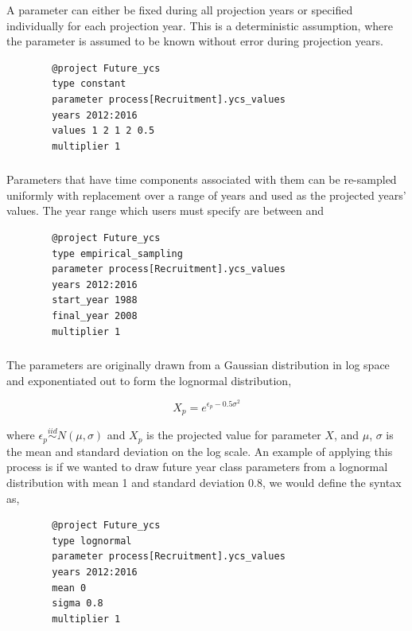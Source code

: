 A parameter can either be fixed during all projection years or specified individually for each projection year. This is a deterministic assumption, where the parameter is assumed to be known without error during projection years.

{\small{\begin{verbatim}
		@project Future_ycs
		type constant
		parameter process[Recruitment].ycs_values
		years 2012:2016
		values 1 2 1 2 0.5
		multiplier 1
		\end{verbatim}}}
	
\subsubsection[Empirical resampling]{}

Parameters that have time components associated with them can be re-sampled uniformly with replacement over a range of years and used as the projected years' values. The year range which users must specify are between  and 
{\small{\begin{verbatim}
		@project Future_ycs
		type empirical_sampling
		parameter process[Recruitment].ycs_values
		years 2012:2016
		start_year 1988
		final_year 2008
		multiplier 1
		\end{verbatim}}}


\subsubsection[Lognormal]{}

The parameters are originally drawn from a Gaussian distribution in log space and exponentiated out to form the lognormal distribution,

\begin{equation}\label{eq:lognormal}
X_p = e^{\epsilon_p- 0.5\sigma^2}
\end{equation}

where $\epsilon_p\stackrel{iid}{\sim}N(\mu,\sigma)$ and $X_p$ is the projected value for parameter $X$, and $\mu$, $\sigma$ is the mean and standard deviation on the log scale. An example of applying this process is if we wanted to draw future year class parameters from a lognormal distribution with mean 1 and standard deviation 0.8, we would define the syntax as,

{\small{\begin{verbatim}
		@project Future_ycs
		type lognormal
		parameter process[Recruitment].ycs_values
		years 2012:2016
		mean 0
		sigma 0.8
		multiplier 1
		\end{verbatim}}}

